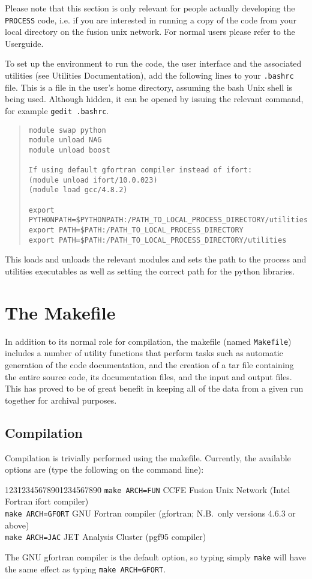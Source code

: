 \documentclass[11pt,a4paper]{report}
\newcommand{\process}{\mbox{\texttt{PROCESS}}}
\begin{document}
Please note that this section is only relevant for people actually developing the \process\/ code, i.e. if you are interested in running a copy of the code from your local directory on the fusion unix network. For normal users please refer to the Userguide.

To set up the environment to run the code, the user interface and the associated utilities (see Utilities Documentation), add the following lines to your \texttt{.bashrc} file.  This is a file in the user's home directory, assuming the bash Unix shell is being used.  Although hidden, it can be opened by issuing the relevant command, for example \texttt{gedit .bashrc}.
\begin{quote}
\begin{verbatim}
module swap python
module unload NAG
module unload boost

If using default gfortran compiler instead of ifort:
(module unload ifort/10.0.023)
(module load gcc/4.8.2)

export PYTHONPATH=$PYTHONPATH:/PATH_TO_LOCAL_PROCESS_DIRECTORY/utilities
export PATH=$PATH:/PATH_TO_LOCAL_PROCESS_DIRECTORY
export PATH=$PATH:/PATH_TO_LOCAL_PROCESS_DIRECTORY/utilities
\end{verbatim}
\end{quote}

This loads and unloads the relevant modules and sets the path to the process and utilities executables as well as setting the correct path for the python libraries.


\section{The Makefile}
\label{sec:makefile}

In addition to its normal role for compilation, the makefile (named
\texttt{Makefile}) includes a number of utility functions that perform tasks
such as automatic generation of the code documentation, and the creation of a
tar file containing the entire source code, its documentation files, and the
input and output files. This has proved to be of great benefit in keeping all
of the data from a given run together for archival purposes.

\subsection{Compilation}

Compilation is trivially performed using the makefile. Currently, the
available options are (type the following on the command line):
\begin{tabbing}
123\=12345678901234567890\= \kill
\> \texttt{make ARCH=FUN} \> CCFE Fusion Unix Network (Intel Fortran ifort compiler) \\
\> \texttt{make ARCH=GFORT} \> GNU Fortran compiler (gfortran; N.B.\ only versions
4.6.3 or above) \\
\> \texttt{make ARCH=JAC} \> JET Analysis Cluster (pgf95 compiler)
\end{tabbing}
The GNU gfortran compiler is the default option, so typing simply
\texttt{make} will have the same effect as typing \texttt{make ARCH=GFORT}.
\end{document}
